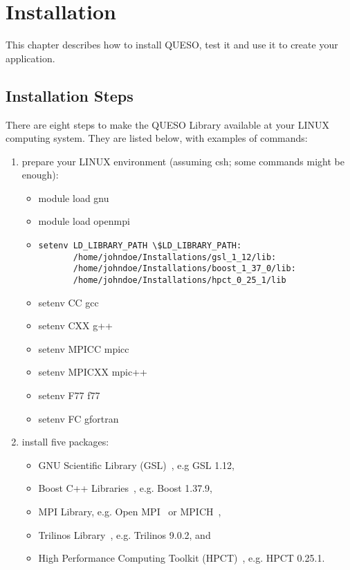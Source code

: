 \chapter{Installation}\label{ch-install}
\thispagestyle{headings}

This chapter describes how to install QUESO, test it and use it to create your application.

\section{Installation Steps}

There are eight steps to make the QUESO Library available at your LINUX computing system.
They are listed below, with examples of commands:
%
\begin{enumerate}
\item {prepare your LINUX environment (assuming csh; some commands might be enough): %
\begin{itemize}
\item module load gnu
\item module load openmpi
\item {
\begin{verbatim}
setenv LD_LIBRARY_PATH \$LD_LIBRARY_PATH:
       /home/johndoe/Installations/gsl_1_12/lib:
       /home/johndoe/Installations/boost_1_37_0/lib:
       /home/johndoe/Installations/hpct_0_25_1/lib
\end{verbatim}
}
\item setenv CC gcc
\item setenv CXX g++
\item setenv MPICC mpicc
\item setenv MPICXX mpic++
\item setenv F77 f77
\item setenv FC gfortran
\end{itemize}
}
\item {install five packages: %
\begin{itemize}
\item GNU Scientific Library (GSL)~\cite{Gsl}, e.g GSL 1.12,
\item Boost C++ Libraries~\cite{Boost}, e.g. Boost 1.37.9,
\item MPI Library, e.g. Open MPI~\cite{Openmpi} or MPICH~\cite{Mpich},
\item Trilinos Library~\cite{Trilinos}, e.g. Trilinos 9.0.2, and
\item {High Performance Computing Toolkit (HPCT)~\cite{Hpct}, e.g. HPCT 0.25.1.
}
\end{itemize}}
\end{enumerate}
